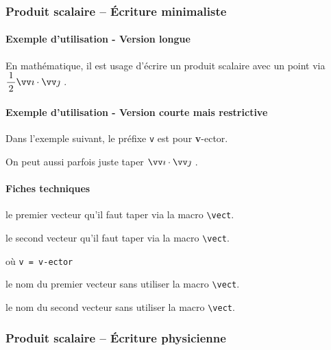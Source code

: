 \documentclass[12pt,a4paper]{article}
\theoremstyle{definition}
\begin{document}

		\subsubsection{Produit scalaire -- Écriture minimaliste}

\paragraph{Exemple d'utilisation - Version longue}

\begin{tcblisting}{}
En mathématique, il est usage d'écrire un produit scalaire avec un point via
$\dotprod{\dfrac{1}{2} \vect{i}}{\vect{j}}$ .
\end{tcblisting}


\paragraph{Exemple d'utilisation - Version courte mais restrictive}

Dans l'exemple suivant, le préfixe \verb+v+ est pour \textbf{v}-ector.

\begin{tcblisting}{}
On peut aussi parfois juste taper $\vdotprod{i}{j}$ .
\end{tcblisting}


\paragraph{Fiches techniques}


 le premier vecteur qu'il faut taper via la macro \verb+\vect+.

 le second vecteur qu'il faut taper via la macro \verb+\vect+.


\bigskip


 où \quad \verb+v = v-ector+

 le nom du premier vecteur sans utiliser la macro \verb+\vect+.

 le nom du second vecteur sans utiliser la macro \verb+\vect+.



		\subsubsection{Produit scalaire -- Écriture \og physicienne \fg}
\end{document}
